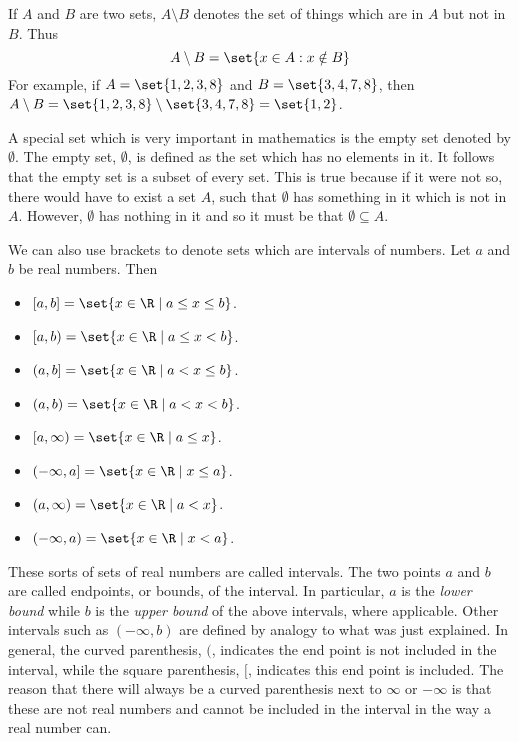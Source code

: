 If $A$ and $B$ are two sets, $A\setminus B$\index{$\setminus$} denotes the set of things which
are in $A$ but not in $B$. Thus
\begin{equation*}
A\setminus B =  \set{x\in A:x\notin B}
\end{equation*}
For example, if $A = \set{1,2,3,8 }$ and $B = \set{3,4,7,8 }$, then $A \setminus B = \set{1,2,3,8} \setminus
\set{3,4,7,8 } =\set{1,2 }$.

A special set which is very important in mathematics is the empty set denoted by $\emptyset$. The empty set, $\emptyset$, is
defined as the set which has no elements in it. It follows that the empty set is a subset of every set.
This is true because if it were not so, there would have to exist a set $A$, such that $\emptyset $
has something in it which is not in $A$. However, $\emptyset $ has nothing
in it and so it must be that $\emptyset \subseteq A$.

We can also use brackets to denote sets which are intervals of numbers. Let $a$ and $b$ be real numbers. Then

\begin{itemize}
\item $[a,b] = \set{x \in \R \mid a\leq x\leq b}$.
\item $[a,b) = \set{x \in \R \mid a\leq x<b}$.
\item $(a,b] = \set{x \in \R \mid a<x\leq b}$.
\item $(a,b) = \set{x \in \R \mid a<x<b}$.
\item $[a,\infty) = \set{x \in \R \mid a\leq x}$.
\item $(-\infty,a] = \set{x \in \R \mid x\leq a}$.
\item $(a,\infty) = \set{x \in \R \mid a<x}$.
\item $(-\infty,a) = \set{x \in \R \mid x<a}$.
\end{itemize}

These sorts of sets of real
numbers are called intervals. The two points $a$ and $b$ are called
endpoints, or bounds, of the interval. In particular, $a$ is the {\em lower bound }  while $b$ is the {\em upper bound } of the above
intervals, where applicable. Other intervals such as $(-\infty ,b) $
are defined by analogy to what was just explained.
 In general, the curved
parenthesis, $($, indicates the end point is not included in the interval, while
the square parenthesis, $[$, indicates this end point is included. The reason that
there will always be a curved parenthesis next to $\infty $ or $-\infty $ is
that these are not real numbers and cannot be included in the interval in the way a real number can.

